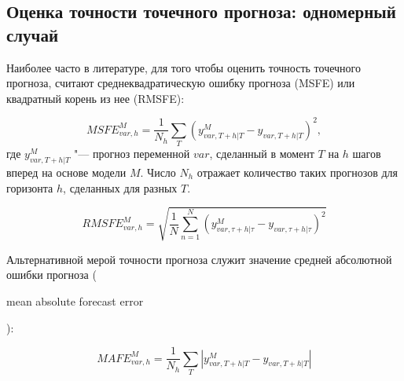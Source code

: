 \documentclass[11pt]{article} %
\newcommand{\eng}[1]{\begin{otherlanguage}{english}#1\end{otherlanguage}}
\begin{document}
\subsection{Оценка точности точечного прогноза: одномерный случай}


 Наиболее часто в литературе, для того чтобы оценить точность  точечного прогноза, считают среднеквадратическую ошибку прогноза (MSFE) или квадратный корень из нее (RMSFE):

\begin{equation}
MSFE_{var,h}^{M}=\frac{1}{N_h}\sum_{T} (y_{var,T+h|T}^{M}-y_{var,T+h|T})^2,
\end{equation}
где $y_{var,T+h|T}^{M}$ "--- прогноз переменной $var$, сделанный в момент $T$ на $h$ шагов вперед на основе модели $M$. Число $N_h$ отражает количество таких прогнозов для горизонта $h$, сделанных для разных $T$.

\begin{equation}
RMSFE_{var,h}^{M}=\sqrt{\frac{1}{N}\sum_{n=1}^{N} \left(y_{var,\tau+h|\tau}^{M}-y_{var,\tau+h|\tau}\right)^2}
\end{equation}

Альтернативной мерой точности прогноза служит значение средней абсолютной ошибки прогноза (\eng{mean absolute forecast error}):


\begin{equation}
MAFE_{var,h}^{M}=\frac{1}{N_h}\sum_{T} |y_{var,T+h|T}^{M}-y_{var,T+h|T}|
\end{equation}
\end{document}
